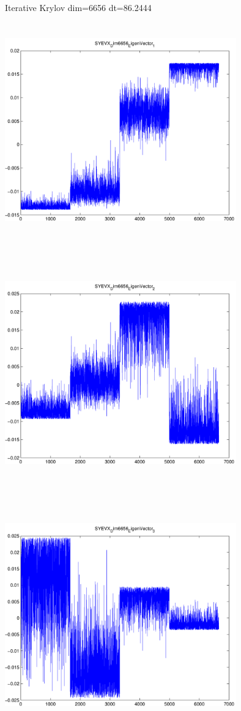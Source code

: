 \documentclass[9pt]{article}
\theoremstyle{plain}
\theoremstyle{definition}
\theoremstyle{remark}
\numberwithin{equation}{section}
\begin{document}
Iterative Krylov dim=6656 dt=86.2444
\includegraphics[width=10.0cm,height=10.0cm]{SYEVX_Dim6656_EigenVector_1.pdf}

\includegraphics[width=10.0cm,height=10.0cm]{SYEVX_Dim6656_EigenVector_2.pdf}

\includegraphics[width=10.0cm,height=10.0cm]{SYEVX_Dim6656_EigenVector_3.pdf}
\end{document}
